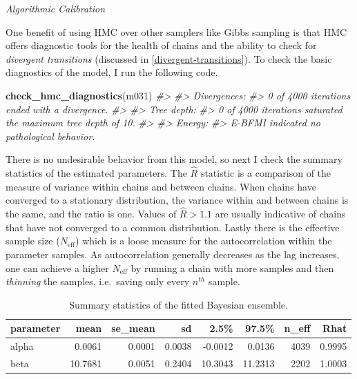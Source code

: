 \documentclass[11pt, oneside, openany]{scrbook}
\newenvironment{Shaded}{\begin{snugshade}}{\end{snugshade}}
\newcommand{\CommentTok}[1]{\textcolor[rgb]{0.56,0.35,0.01}{\textit{#1}}}
\newcommand{\KeywordTok}[1]{\textcolor[rgb]{0.13,0.29,0.53}{\textbf{#1}}}
\newcommand{\NormalTok}[1]{#1}
\begin{document}

\emph{Algorithmic Calibration}

One benefit of using HMC over other samplers like Gibbs sampling is that HMC offers diagnostic tools for the health of chains and the ability to check for \emph{divergent transitions} (discussed in \ref{divergent-transitions}). To check the basic diagnostics of the model, I run the following code.


\begin{Shaded}
\begin{Highlighting}[]
\KeywordTok{check_hmc_diagnostics}\NormalTok{(m031)}
\CommentTok{#> }
\CommentTok{#> Divergences:}
\CommentTok{#> 0 of 4000 iterations ended with a divergence.}
\CommentTok{#> }
\CommentTok{#> Tree depth:}
\CommentTok{#> 0 of 4000 iterations saturated the maximum tree depth of 10.}
\CommentTok{#> }
\CommentTok{#> Energy:}
\CommentTok{#> E-BFMI indicated no pathological behavior.}
\end{Highlighting}
\end{Shaded}


There is no undesirable behavior from this model, so next I check the summary statistics of the estimated parameters. The \(\hat{R}\) statistic is a comparison of the measure of variance within chains and between chains. When chains have converged to a stationary distribution, the variance within and between chains is the same, and the ratio is one. Values of \(\hat{R} > 1.1\) are usually indicative of chains that have not converged to a common distribution. Lastly there is the effective sample size (\(N_{\mathrm{eff}}\)) which is a loose measure for the autocorrelation within the parameter samples. As autocorrelation generally decreases as the lag increases, one can achieve a higher \(N_{\mathrm{eff}}\) by running a chain with more samples and then \emph{thinning} the samples, i.e.~saving only every \(n^{th}\) sample.

\begin{table}[!h]

\caption{\label{tab:ch031-Cloudy-Toupee}Summary statistics of the fitted Bayesian ensemble.}
\centering
\begin{tabular}[t]{lrrrrrrr}
\toprule
parameter & mean & se\_mean & sd & 2.5\% & 97.5\% & n\_eff & Rhat\\
\midrule
alpha & 0.0061 & 0.0001 & 0.0038 & -0.0012 & 0.0136 & 4039 & 0.9995\\
beta & 10.7681 & 0.0051 & 0.2404 & 10.3043 & 11.2313 & 2202 & 1.0003\\
\bottomrule
\end{tabular}
\end{table}
\end{document}
